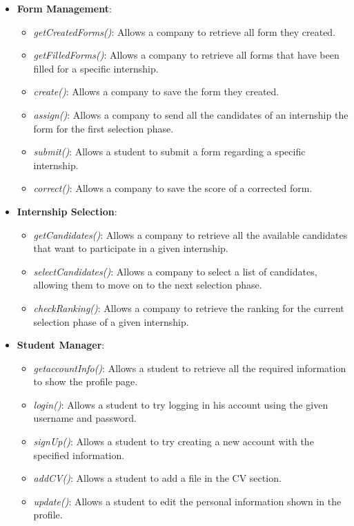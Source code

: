 \documentclass[11pt,twoside]{article}
\begin{document}
\begin{itemize}
\item \textbf{Form Management}:
	\begin{itemize}
	\item \textit{getCreatedForms()}: Allows a company to retrieve all form they created.
	\item \textit{getFilledForms()}: Allows a company to retrieve all forms that have been filled for a specific internship.
	\item \textit{create()}: Allows a company to save the form they created.
	\item \textit{assign()}: Allows a company to send all the candidates of an internship the form for the first selection phase.
	\item \textit{submit()}: Allows a student to submit a form regarding a specific internship.
	\item \textit{correct()}: Allows a company to save the score of a corrected form.
	\end{itemize}
	
\item \textbf{Internship Selection}:
	\begin{itemize}
	\item \textit{getCandidates()}: Allows a company to retrieve all the available candidates that want to participate in a given internship.
	\item \textit{selectCandidates()}: Allows a company to select a list of candidates, allowing them to move on to the next selection phase.
	\item \textit{checkRanking()}: Allows a company to retrieve the ranking for the current selection phase of a given internship.
	\end{itemize}
	
\item \textbf{Student Manager}:
	\begin{itemize}
	\item \textit{getaccountInfo()}: Allows a student to retrieve all the required information to show the profile page.
	\item \textit{login()}: Allows a student to try logging in his account using the given username and password.
	\item \textit{signUp()}: Allows a student to try creating a new account with the specified information.
	\item \textit{addCV()}: Allows a student to add a file in the CV section.
	\item \textit{update()}: Allows a student to edit the personal information shown in the profile.
	\end{itemize}
	

\end{itemize}
\end{document}
